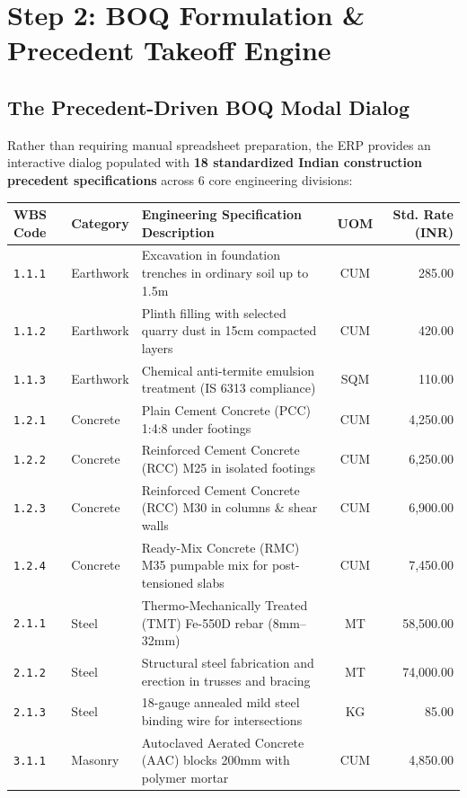 \documentclass[11pt,a4paper]{article}
\begin{document}
\section{Step 2: BOQ Formulation \& Precedent Takeoff Engine}

\subsection{The Precedent-Driven BOQ Modal Dialog}
Rather than requiring manual spreadsheet preparation, the ERP provides an interactive dialog populated with \textbf{18 standardized Indian construction precedent specifications} across 6 core engineering divisions:

\begin{table}[h!]
\centering
\scriptsize
\begin{tabularx}{\textwidth}{l l l c r}
\toprule
\textbf{WBS Code} & \textbf{Category} & \textbf{Engineering Specification Description} & \textbf{UOM} & \textbf{Std. Rate (INR)} \\
\midrule
\texttt{1.1.1} & Earthwork & Excavation in foundation trenches in ordinary soil up to 1.5m & CUM & 285.00 \\
\texttt{1.1.2} & Earthwork & Plinth filling with selected quarry dust in 15cm compacted layers & CUM & 420.00 \\
\texttt{1.1.3} & Earthwork & Chemical anti-termite emulsion treatment (IS 6313 compliance) & SQM & 110.00 \\
\texttt{1.2.1} & Concrete & Plain Cement Concrete (PCC) 1:4:8 under footings & CUM & 4,250.00 \\
\texttt{1.2.2} & Concrete & Reinforced Cement Concrete (RCC) M25 in isolated footings & CUM & 6,250.00 \\
\texttt{1.2.3} & Concrete & Reinforced Cement Concrete (RCC) M30 in columns \& shear walls & CUM & 6,900.00 \\
\texttt{1.2.4} & Concrete & Ready-Mix Concrete (RMC) M35 pumpable mix for post-tensioned slabs & CUM & 7,450.00 \\
\texttt{2.1.1} & Steel & Thermo-Mechanically Treated (TMT) Fe-550D rebar (8mm--32mm) & MT & 58,500.00 \\
\texttt{2.1.2} & Steel & Structural steel fabrication and erection in trusses and bracing & MT & 74,000.00 \\
\texttt{2.1.3} & Steel & 18-gauge annealed mild steel binding wire for intersections & KG & 85.00 \\
\texttt{3.1.1} & Masonry & Autoclaved Aerated Concrete (AAC) blocks 200mm with polymer mortar & CUM & 4,850.00 \\

\end{tabularx}
\end{table}
\end{document}
